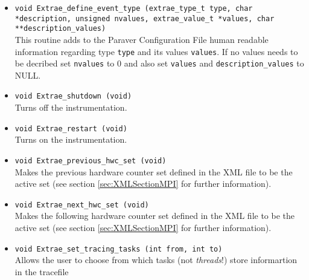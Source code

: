 \begin{itemize}
 \item {\tt void Extrae\_define\_event\_type (extrae\_type\_t type, char *description, unsigned nvalues, extrae\_value\_t *values, char **description\_values)}\\
 This routine adds to the Paraver Configuration File human readable information regarding type {\tt type} and its values {\tt values}. If no values needs to be decribed set {\tt nvalues} to 0 and also set {\tt values} and {\tt description\_values} to NULL.

 \item {\tt void Extrae\_shutdown (void)}\\
  Turns off the instrumentation.

 \item {\tt void Extrae\_restart (void)}\\
  Turns on the instrumentation.

 \item {\tt void Extrae\_previous\_hwc\_set (void)}\\
  Makes the previous hardware counter set defined in the XML file to be the active set (see section \ref{sec:XMLSectionMPI} for further information).

 \item {\tt void Extrae\_next\_hwc\_set (void)}\\
  Makes the following hardware counter set defined in the XML file to be the active set (see section \ref{sec:XMLSectionMPI} for further information).

 \item {\tt void Extrae\_set\_tracing\_tasks (int from, int to)}\\
  Allows the user to choose from which tasks (not {\em threads}!) store informartion in the tracefile


\end{itemize}
